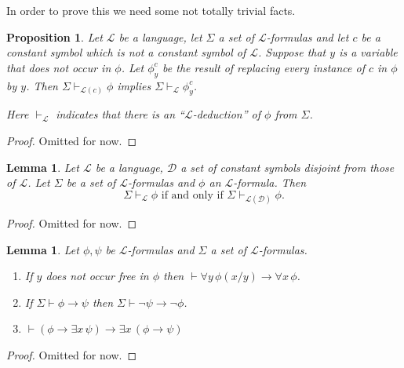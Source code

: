 \documentclass[11pt]{article}
\newcommand{\proves}{\vdash}
\newtheorem{proposition}[theorem]{Proposition}
\newtheorem{lemma}[theorem]{Lemma}
\newcommand{\mcal}[1]{\mathcal{#1}}
\begin{document}
In order to prove this we need some not totally trivial facts.
\begin{proposition}\label{constbyvar}
Let $\mcal{L}$ be a language, let $\Sigma$ a set of $\mcal{L}$-formulas and let $c$ be a constant symbol which is not a constant symbol of $\mcal{L}$.
Suppose that $y$ is a variable that does not occur in $\phi$. Let $\phi_y^c$ be the result of replacing every instance of $c$ in $\phi$ by $y$. Then $\Sigma\proves_{\mcal{L}(c)} \phi$ implies $\Sigma\proves_{\mcal{L}}\phi_y^c$.

\medskip

\noindent
Here $\proves_\mcal{L}$ indicates that there is an ``$\mcal{L}$-deduction'' of $\phi$ from $\Sigma$.

\end{proposition}
\begin{proof}
Omitted for now.
\end{proof}


\begin{lemma}
Let $\mcal{L}$ be a language, $\mcal{D}$ a set of constant symbols disjoint from those of $\mcal{L}$. Let $\Sigma$ be a set of $\mcal{L}$-formulas and $\phi$ an $\mcal{L}$-formula. Then
\[\Sigma\proves_\mcal{L} \phi \text{ if and only if }\Sigma\proves_{\mcal{L}(\mcal{D})}\phi.\]

\end{lemma}
\begin{proof}
Omitted for now.
\end{proof}


\begin{lemma}\label{Adedforwit}
Let $\phi,\psi$ be $\mcal{L}$-formulas and $\Sigma$ a set of $\mcal{L}$-formulas.
\begin{enumerate}
\item If $y$ does not occur free in $\phi$ then $\proves \forall y\,\phi(x/y)\rightarrow \forall x \, \phi$.
\item If $\Sigma\proves \phi\rightarrow \psi$ then $\Sigma\proves \neg\psi\rightarrow \neg\phi$.
\item $\proves(\phi\rightarrow \exists x\,\psi)\rightarrow \exists x\,(\phi\rightarrow \psi)$
\end{enumerate}

\end{lemma}
\begin{proof}
Omitted for now.
\end{proof}
\end{document}
